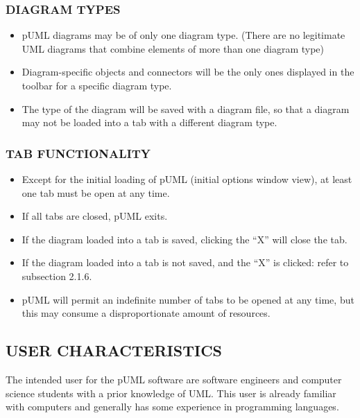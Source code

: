 \documentclass[twoside,letterpaper]{article}
\begin{document}
{\bigskip


\subsubsection[DIAGRAM TYPES]{\bfseries DIAGRAM TYPES}

\begin{itemize}
\item pUML diagrams may be of only one diagram type. (There are no legitimate UML diagrams that combine elements of more than one diagram type)
\item Diagram-specific objects and connectors will be the only ones displayed in the toolbar for a specific diagram type.
\item The type of the diagram will be saved with a diagram file, so that a diagram may not be loaded into a tab with a different diagram type.
\end{itemize}


\bigskip

\subsubsection[TAB FUNCTIONALITY]{\bfseries TAB FUNCTIONALITY}

\begin{itemize}
\item Except for the initial loading of pUML (initial options window view), at least one tab must be open at any time.
\item If all tabs are closed, pUML exits.
\item If the diagram loaded into a tab is saved, clicking the ``X'' will close the tab.
\item If the diagram loaded into a tab is not saved, and the ``X'' is clicked: refer to subsection 2.1.6.
\item pUML will permit an indefinite number of tabs to be opened at any time, but this may consume a disproportionate amount of resources.
\end{itemize}



\bigskip




}

\subsection[USER CHARACTERISTICS]{\bfseries
USER CHARACTERISTICS}
{
The intended user for the pUML software are software engineers and computer science students with a prior knowledge of UML. This user is already familiar with computers and generally has some experience in programming languages.
}
\end{document}

